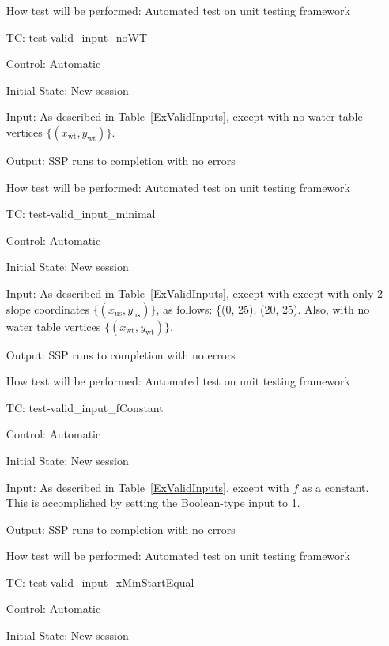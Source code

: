 \documentclass[12pt, titlepage]{article}
\newcounter{testnum} %
\newcommand{\progname}{SSP}
\begin{document}
\begin{enumerate}[label=TC\arabic*:,ref={\arabic*}]
How test will be performed: Automated test on unit testing framework

\item [TC\refstepcounter{testnum}\thetestnum: \label{TC_ValidInNoWT}] 
test-valid\_input\_noWT

Control: Automatic

Initial State: New session

Input: As described in Table~\ref{ExValidInputs}, except with no water table 
vertices $\{\left(x_\text{wt},y_\text{wt}\right)\}$.

Output: \progname{} runs to completion with no errors

How test will be performed: Automated test on unit testing framework

\item [TC\refstepcounter{testnum}\thetestnum: \label{TC_ValidInMin}] 
test-valid\_input\_minimal

Control: Automatic

Initial State: New session

Input: As described in Table~\ref{ExValidInputs}, except with  except with only 
2 slope coordinates $\{\left(x_\text{us},y_\text{us}\right)\}$, as follows: 
\{(0, 
25), (20, 25). Also, with no water table vertices 
$\{\left(x_\text{wt},y_\text{wt}\right)\}$.

Output: \progname{} runs to completion with no errors

How test will be performed: Automated test on unit testing framework

\item [TC\refstepcounter{testnum}\thetestnum: \label{TC_ValidInConstant}] 
test-valid\_input\_fConstant

Control: Automatic

Initial State: New session

Input: As described in Table~\ref{ExValidInputs}, except with $f$ as a 
constant. This is accomplished by setting the Boolean-type input to 1.

Output: \progname{} runs to completion with no errors

How test will be performed: Automated test on unit testing framework

\item [TC\refstepcounter{testnum}\thetestnum: \label{TC_ValidInXMinStartEqual}] 
test-valid\_input\_xMinStartEqual

Control: Automatic

Initial State: New session


\end{enumerate}
\end{document}
